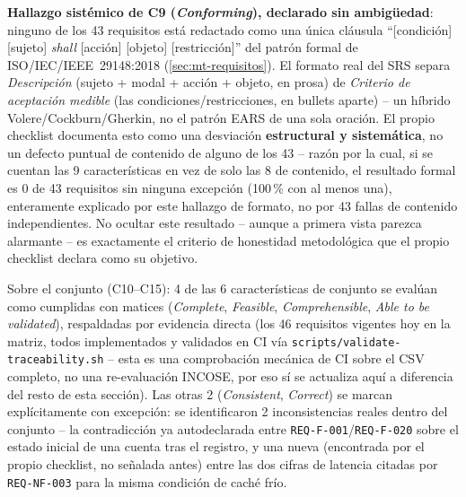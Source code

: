\textbf{Hallazgo sistémico de C9 (\emph{Conforming}), declarado sin
ambigüedad}: ninguno de los 43 requisitos está redactado como una única
cláusula ``[condición] [sujeto] \emph{shall} [acción] [objeto]
[restricción]'' del patrón formal de ISO/IEC/IEEE~29148:2018
(\autoref{sec:mt-requisitos}). El formato
real del SRS separa \emph{Descripción} (sujeto + modal + acción +
objeto, en prosa) de \emph{Criterio de aceptación medible} (las
condiciones/restricciones, en bullets aparte) -- un híbrido
Volere/Cockburn/Gherkin, no el patrón EARS de una sola oración. El
propio checklist documenta esto como una desviación
\textbf{estructural y sistemática}, no un defecto puntual de contenido
de alguno de los 43 -- razón por la cual, si se cuentan las 9
características en vez de solo las 8 de contenido, el resultado formal
es 0 de 43 requisitos sin ninguna excepción (100\,\% con al menos una),
enteramente explicado por este hallazgo de formato, no por 43 fallas de
contenido independientes. No ocultar este resultado -- aunque a primera
vista parezca alarmante -- es exactamente el criterio de honestidad
metodológica que el propio checklist declara como su objetivo.

Sobre el conjunto (C10--C15): 4 de las 6 características de conjunto se
evalúan como cumplidas con matices (\emph{Complete}, \emph{Feasible},
\emph{Comprehensible}, \emph{Able to be validated}), respaldadas por
evidencia directa (los 46 requisitos vigentes hoy en la matriz, todos
implementados y validados en CI vía
\texttt{scripts/validate-traceability.sh} -- esta es una comprobación
mecánica de CI sobre el CSV completo, no una re-evaluación INCOSE, por
eso sí se actualiza aquí a diferencia del resto de esta sección). Las
otras 2
(\emph{Consistent}, \emph{Correct}) se marcan explícitamente con
excepción: se identificaron 2 inconsistencias reales dentro del
conjunto -- la contradicción ya autodeclarada entre
\texttt{REQ-F-001}/\texttt{REQ-F-020} sobre el estado inicial de una
cuenta tras el registro, y una nueva (encontrada por el propio
checklist, no señalada antes) entre las dos cifras de latencia citadas
por \texttt{REQ-NF-003} para la misma condición de caché frío.
